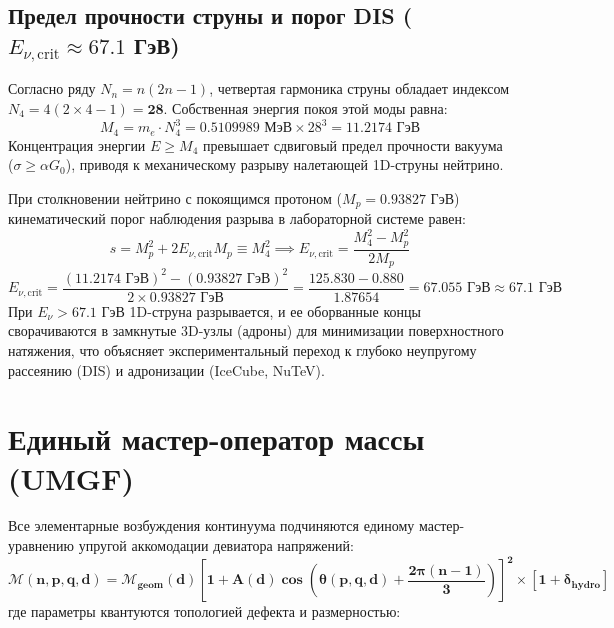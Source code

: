 \documentclass[12pt,a4paper]{article}
\begin{document}
	\subsection{Предел прочности струны и порог DIS ($E_{\nu, \text{crit}} \approx 67.1$ ГэВ)}
	Согласно ряду $N_n = n(2n-1)$, четвертая гармоника струны обладает индексом $N_4 = 4(2 \times 4 - 1) = \mathbf{28}$. Собственная энергия покоя этой моды равна:
	\begin{equation}
		M_4 = m_e \cdot N_4^3 = 0.5109989 \text{ МэВ} \times 28^3 = \mathbf{11.2174 \text{ ГэВ}}
	\end{equation}
	Концентрация энергии $E \ge M_4$ превышает сдвиговый предел прочности вакуума ($\sigma \ge \alpha G_0$), приводя к механическому разрыву налетающей 1D-струны нейтрино. 
	
	При столкновении нейтрино с покоящимся протоном ($M_p = 0.93827$ ГэВ) кинематический порог наблюдения разрыва в лабораторной системе равен:
	\begin{equation}
		s = M_p^2 + 2 E_{\nu, \text{crit}} M_p \equiv M_4^2 \implies E_{\nu, \text{crit}} = \frac{M_4^2 - M_p^2}{2 M_p}
	\end{equation}
	\begin{equation}
		E_{\nu, \text{crit}} = \frac{(11.2174 \text{ ГэВ})^2 - (0.93827 \text{ ГэВ})^2}{2 \times 0.93827 \text{ ГэВ}} = \frac{125.830 - 0.880}{1.87654} = \mathbf{67.055 \text{ ГэВ}} \approx \mathbf{67.1 \text{ ГэВ}}
	\end{equation}
	При $E_\nu > 67.1$ ГэВ 1D-струна разрывается, и ее оборванные концы сворачиваются в замкнутые 3D-узлы (адроны) для минимизации поверхностного натяжения, что объясняет экспериментальный переход к глубоко неупругому рассеянию (DIS) и адронизации (IceCube, NuTeV).
	
	\section{Единый мастер-оператор массы (UMGF)}
	
	Все элементарные возбуждения континуума подчиняются единому мастер-уравнению упругой аккомодации девиатора напряжений:
	\begin{equation}
		\mathbf{\mathcal{M}(n, p, q, d) = \mathcal{M}_{\text{geom}}(d) \left[ 1 + A(d) \cos\left( \theta(p,q,d) + \frac{2\pi(n-1)}{3} \right) \right]^2 \times \left[ 1 + \delta_{\text{hydro}} \right]}
	\end{equation}
	где параметры квантуются топологией дефекта и размерностью:
	
\end{document}
